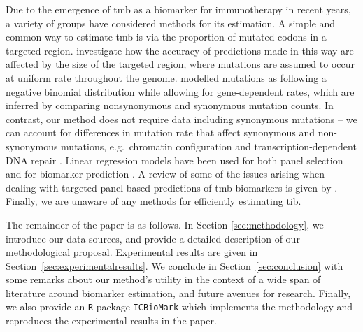 \documentclass[12pt]{article}
\begin{document}
Due to the emergence of \acrshort{tmb} as a biomarker for immunotherapy in recent years, a variety of groups have considered methods for its estimation. A simple and common way to estimate \acrshort{tmb} is via the proportion of mutated codons in a targeted region. \citet{budczies_optimizing_2019} investigate how the accuracy of predictions made in this way are affected by the size of the targeted region, where mutations are assumed to occur at uniform rate throughout the genome. \citet{yao_ectmb_2020} modelled mutations as following a negative binomial distribution while allowing for gene-dependent rates, which are inferred by comparing nonsynonymous and synonymous mutation counts. In contrast, our method does not require data including synonymous mutations -- we can account for differences in mutation rate that affect synonymous and non-synonymous mutations, e.g.~chromatin configuration \citep{makova_effects_2015} and transcription-dependent DNA repair \citep{fong_intertwined_2013}.  Linear regression models have been used for both panel selection \citep{lyu_mutation_2018} and for biomarker prediction \citep{guo_exon_2020}. A review of some of the issues arising when dealing with targeted panel-based predictions of \acrshort{tmb} biomarkers is given by \citet{wu_designing_2019}. Finally, we are unaware of any methods for efficiently estimating \acrshort{tib}. 

The remainder of the paper is as follows. In Section \ref{sec:methodology}, we introduce our data sources, and provide a detailed description of our methodological proposal. Experimental results are given in Section~\ref{sec:experimentalresults}.  We conclude in Section~\ref{sec:conclusion} with some remarks about our method's utility in the context of a wide span of literature around biomarker estimation, and future avenues for research.  Finally, we also provide an \texttt{R} package \texttt{ICBioMark} \citet{BradleyCannings_2020} which implements the methodology and reproduces the experimental results in the paper. 

\end{document}
